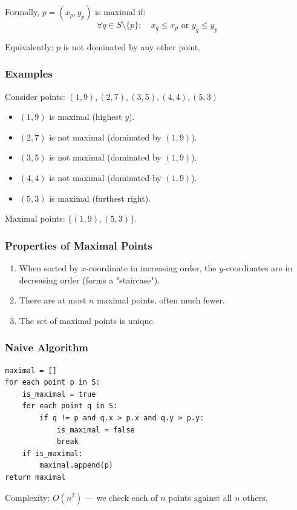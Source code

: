 \documentclass[11pt]{article}
\begin{document}
{Formally, $p = (x_p, y_p)$ is maximal if:
\[
\forall q \in S \setminus \{p\}: \quad x_q \le x_p \text{ or } y_q \le y_p
\]

Equivalently: $p$ is not dominated by any other point.

\subsubsection*{Examples}
Consider points: $(1,9), (2,7), (3,5), (4,4), (5,3)$

\begin{itemize}
\item $(1,9)$ is maximal (highest $y$).
\item $(2,7)$ is not maximal (dominated by $(1,9)$).
\item $(3,5)$ is not maximal (dominated by $(1,9)$).
\item $(4,4)$ is not maximal (dominated by $(1,9)$).
\item $(5,3)$ is maximal (furthest right).
\end{itemize}

Maximal points: $\{(1,9), (5,3)\}$.

\subsubsection*{Properties of Maximal Points}
\begin{enumerate}
\item When sorted by $x$-coordinate in increasing order, the $y$-coordinates are in decreasing order (forms a "staircase").
\item There are at most $n$ maximal points, often much fewer.
\item The set of maximal points is unique.
\end{enumerate}

\subsubsection*{Naive Algorithm}
\begin{lstlisting}
maximal = []
for each point p in S:
    is_maximal = true
    for each point q in S:
        if q != p and q.x > p.x and q.y > p.y:
            is_maximal = false
            break
    if is_maximal:
        maximal.append(p)
return maximal
\end{lstlisting}

Complexity: $O(n^2)$ — we check each of $n$ points against all $n$ others.

}
\end{document}
